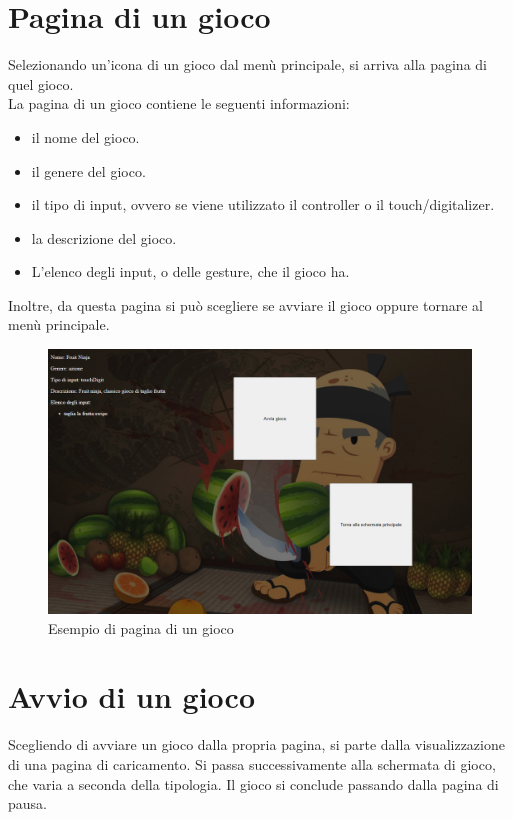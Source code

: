 \section{Pagina di un gioco}
Selezionando un'icona di un gioco dal menù principale, si arriva alla pagina di quel gioco.\\
La pagina di un gioco contiene le seguenti informazioni:
\begin{itemize}
    \item il nome del gioco.
    \item il genere del gioco.
    \item il tipo di input, ovvero se viene utilizzato il controller o il touch/digitalizer.
    \item la descrizione del gioco.
    \item L'elenco degli input, o delle gesture, che il gioco ha.
\end{itemize}
Inoltre, da questa pagina si può scegliere se avviare il gioco oppure tornare al menù principale.
\begin{figure}[h]
    \centering
    \includegraphics[width=340pt]{schermataPaginaGioco.png}
    \caption{Esempio di pagina di un gioco}
    \label{fig:schermataPaginaGioco}
\end{figure}
\newpage
\section{Avvio di un gioco}
Scegliendo di avviare un gioco dalla propria pagina, si parte dalla visualizzazione di una pagina di caricamento. Si passa successivamente alla schermata di gioco, che varia a seconda della tipologia. Il gioco si conclude passando dalla pagina di pausa.
